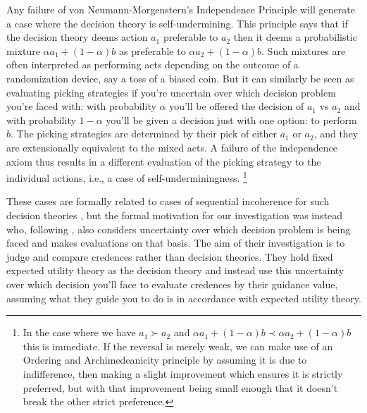 \documentclass[a4paper]{article}
\newenvironment{CCM rewritten}
{\begingroup\color{blue}} %
{\endgroup}              %
\begin{document}
Any failure of von Neumann-Morgenstern's Independence Principle will generate a case where the decision theory is self-undermining.
This principle says that if the decision theory deems action $a_1$ preferable to $a_2$ then it deems a probabilistic mixture $\alpha a_1+(1-\alpha)b$ as preferable to $\alpha a_2+(1-\alpha)b$. 
Such mixtures are often interpreted as performing acts depending on the outcome of a randomization device, say a toss of a biased coin. 
But it can similarly be seen as evaluating picking strategies if you're uncertain over which decision problem you're faced with: with probability $\alpha$ you'll be offered the decision of $a_1$ vs $a_2$ and with probability $1-\alpha$ you'll be given a decision just with one option: to perform $b$. The picking strategies are determined by their pick of either $a_1$ or $a_2$, and they are extensionally equivalent to the mixed acts. A failure of the independence axiom thus results in a different evaluation of the picking strategy to the individual actions, i.e., a case of self-underminingness.%
\footnote{
	In the case where we have $a_1\succ a_2$ and $\alpha a_1 +(1-\alpha)b\prec \alpha a_2 + (1-\alpha)b$ this is immediate. 
	If the reversal is merely weak, we can make use of an Ordering and Archimedeanicity principle by assuming it is due to indifference, then making a slight improvement which ensures it is strictly preferred, but with that improvement being small enough that it doesn't break the other strict preference. 
}

These cases are formally related to cases of sequential incoherence for such decision theories \citep{hammond1988cfeu,machina1989}, but the formal motivation for our investigation was instead \citet{levinstein2017pgeu} who, following \citet{schervish2009psr}, also considers uncertainty over which decision problem is being faced and makes evaluations on that basis. 
The aim of their investigation is to judge and compare credences rather than decision theories.
They hold fixed expected utility theory as the decision theory and instead use this uncertainty over which decision you'll face to evaluate credences by their guidance value, assuming what they guide you to do is in accordance with expected utility theory. 
\end{document}
